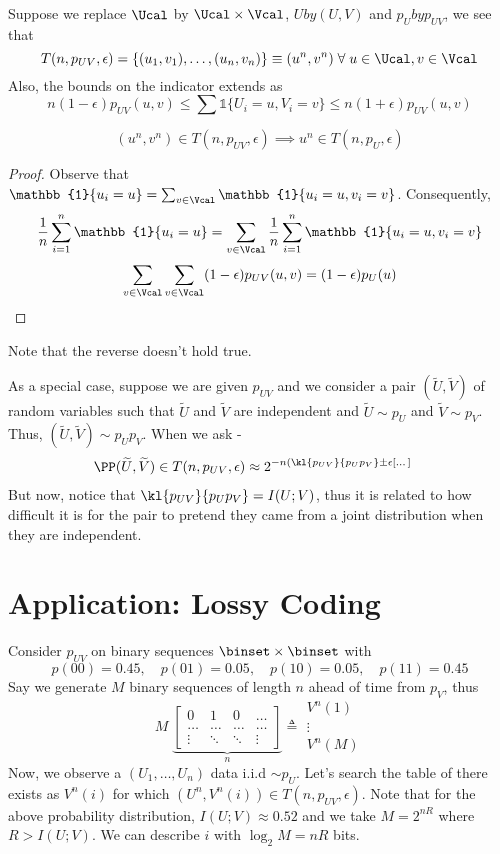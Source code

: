 Suppose we replace $\Ucal$ by $\Ucal \times \Vcal$, $U by (U, V)$ and $p_U by p_{UV}$, we see that 
\[T(n, p_{UV}, \epsilon) = \{(u_1, v_1), \dots , (u_n, v_n) \} \equiv (u^n, v^n) \; \forall \; u \in \Ucal, v \in \Vcal \]
Also, the bounds on the indicator extends as
\[n(1-\epsilon) p_{UV}(u, v) \leq \sum \mathbb{1}\{U_i = u, V_i = v\} \leq n(1+\epsilon) p_{UV}(u, v)\]
\begin{lemma}
\[(u^n, v^n) \in T(n, p_{UV}, \epsilon) \implies u^n \in T(n, p_U, \epsilon)\]
\end{lemma}
\begin{proof}
Observe that $\mathbb{1}\{u_i = u\} = \sum_{v \in \Vcal} \mathbb{1} \{ u_i = u, v_i = v\}$. Consequently, $$\frac{1}{n} \sum_{i=1}^n \mathbb{1}\{u_i = u\} = \sum_{v \in \Vcal} \frac{1}{n} \sum_{i=1}^n \mathbb{1}\{u_i = u, v_i = v\}$$
\[ \sum_{v \in \Vcal} \sum_{v \in \Vcal} (1-\epsilon) p_{UV}(u, v) = (1-\epsilon) p_U(u)\]
\end{proof}
\begin{remark}
Note that the reverse doesn't hold true.
\end{remark}
As a special case, suppose we are given $p_{UV}$ and we consider a pair $(\widetilde U, \widetilde V)$ of random variables such that $\widetilde U$ and $\widetilde V$  are independent and $\widetilde U \sim p_U$ and $\widetilde V \sim p_V$. Thus, $(\widetilde U, \widetilde V) \sim p_U p_V$. When we ask -
\begin{align*}
    \PP(\widetilde U, \widetilde V) \in T(n, p_{UV}, \epsilon) &\approx 2^{-n(\kl{p_{UV}}{p_Up_V} \pm \epsilon[\dots]}
\end{align*}
But now, notice that $\kl{p_{UV}}{p_Up_V} = I(U;V)$, thus it is related to how difficult it is for the pair to pretend they came from a joint distribution when they are independent. 
\section{Application: Lossy Coding}
Consider $p_{UV}$ on binary sequences $\binset \times \binset$ with 
\[p(00) = 0.45,\quad p(01) = 0.05,\quad p(10) = 0.05,\quad p(11)=0.45 \]
Say we generate $M$ binary sequences of length $n$ ahead of time from $p_V$, thus
\[M \;\underbrace{\begin{bmatrix}
0 & 1 & 0 & \dots \\
\dots &\dots & \dots & \dots \\
\vdots & \ddots & \ddots & \vdots
\end{bmatrix}}_{n} \triangleq \begin{matrix}
V^n(1) \\ \vdots \\ V^n(M)
\end{matrix}\]
Now, we observe a $(U_1, \dots, U_n)$ data i.i.d $\sim p_U$. Let's search the table of there exists as $V^n(i)$ for which $(U^n, V^n(i)) \in T(n, p_{UV}, \epsilon)$. Note that for the above probability distribution, $I(U;V) \approx 0.52$ and we take $M = 2^{nR}$ where $R > I(U;V)$. We can describe $i$ with $\log_2 M = nR$ bits.

